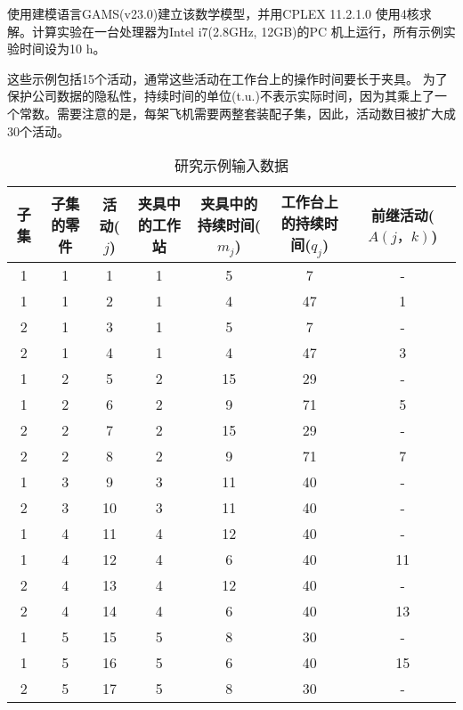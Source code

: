 使用建模语言GAMS(v23.0)建立该数学模型，并用CPLEX 11.2.1.0 使用4核求解。计算实验在一台处理器为Intel i7(2.8GHz, 12GB)的PC 机上运行，所有示例实验时间设为10 h。

这些示例包括15个活动，通常这些活动在工作台上的操作时间要长于夹具。
为了保护公司数据的隐私性，持续时间的单位(t.u.)不表示实际时间，因为其乘上了一个常数。需要注意的是，每架飞机需要两整套装配子集，因此，活动数目被扩大成30个活动。
\begin{table}[h]
  \centering
  \caption{研究示例输入数据}
    \begin{tabular}{ccccccc}
    \toprule
子集 &子集的零件 &活动($j$) &\multicolumn{1}{m{23mm}}{\centering 夹具中的工作站} &\multicolumn{1}{m{23mm}}{\centering 夹具中的持续时间($m_j$)} &  \multicolumn{1}{m{23mm}}{\centering 工作台上的持续时间($q_j$)} &  \multicolumn{1}{m{23mm}}{\centering 前继活动($A(j，k)$) }\\
\midrule
    1     & 1     & 1     & 1     & 5     & 7     & - \\
    1     & 1     & 2     & 1     & 4     & 47    & 1 \\
    2     & 1     & 3     & 1     & 5     & 7     & - \\
    2     & 1     & 4     & 1     & 4     & 47    & 3 \\
    1     & 2     & 5     & 2     & 15    & 29    & - \\
    1     & 2     & 6     & 2     & 9     & 71    & 5 \\
    2     & 2     & 7     & 2     & 15    & 29    & - \\
    2     & 2     & 8     & 2     & 9     & 71    & 7 \\
    1     & 3     & 9     & 3     & 11    & 40    & - \\
    2     & 3     & 10    & 3     & 11    & 40    & - \\
    1     & 4     & 11    & 4     & 12    & 40    & - \\
    1     & 4     & 12    & 4     & 6     & 40    & 11 \\
    2     & 4     & 13    & 4     & 12    & 40    & - \\
    2     & 4     & 14    & 4     & 6     & 40    & 13 \\
    1     & 5     & 15    & 5     & 8     & 30    & - \\
    1     & 5     & 16    & 5     & 6     & 40    & 15 \\
    2     & 5     & 17    & 5     & 8     & 30    & - \\

\end{tabular}
\end{table}
